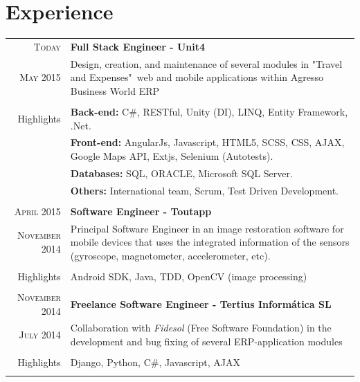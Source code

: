\documentclass[a4paper,10pt]{article} %
\newcommand{\highlights}{\textcolor{skillscolor}{Highlights}}
\begin{document}
\section{Experience}

\begin{tabular}{r|p{11cm}}

\textsc{Today} & \textbf{Full Stack Engineer - Unit4} \\
\textsc{May 2015} 
& \small{Design, creation, and maintenance of several modules in "Travel and
Expenses"\  web and mobile applications within Agresso Business World ERP}  \\
& \\
\highlights & \textbf{Back-end:} C\#, RESTful, Unity (DI),
LINQ, Entity Framework, .Net. \\
& \textbf{Front-end:} AngularJs, Javascript, HTML5, SCSS, CSS,
AJAX, Google Maps API, Extjs, Selenium (Autotests). \\  
& \textbf{Databases:} SQL, ORACLE, Microsoft SQL Server. \\
& \textbf{Others:} International team, Scrum, Test Driven
Development. \\
\multicolumn{2}{c}{} \\


\textsc{April 2015} & \textbf{Software Engineer - Toutapp} \\
\textsc{November 2014}
& \footnotesize{Principal Software Engineer in an image restoration software for
mobile devices that uses the integrated information of the sensors
(gyroscope, magnetometer, accelerometer, etc).}  \\
           & \\
\highlights & Android SDK, Java, TDD, OpenCV (image
processing)\\

\multicolumn{2}{c}{} \\


\textsc{November 2014} & \textbf{Freelance Software Engineer - Tertius
Informática SL} \\
\textsc{July 2014} 
           & \footnotesize{Collaboration with \textit{Fidesol} (Free Software
  Foundation) in the development and bug fixing of several ERP-application modules} \\
           & \\
\highlights & Django, Python, C\#, Javascript, AJAX \\

\multicolumn{2}{c}{} \\


\end{tabular}
\end{document}
